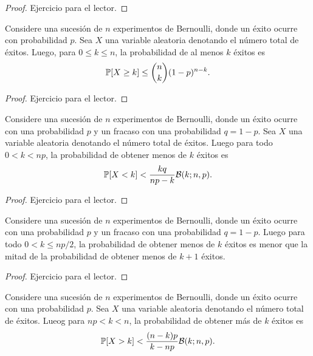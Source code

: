 \begin{proof}
    Ejercicio para el lector.
\end{proof}

\begin{corollary}
    Considere una sucesi\'on de $n$ experimentos de Bernoulli, donde un \'exito ocurre con probabilidad $p$.
    Sea $X$ una variable aleatoria denotando el n\'umero total de \'exitos.
    Luego, para $0 \leq k \leq n$, la probabilidad de al menos $k$ \'exitos es
    \[
        \mathbb{P}[X \geq k] \leq \binom{n}{k} (1 - p)^{n - k}.
    \]
\end{corollary}

\begin{proof}
    Ejercicio para el lector.
\end{proof}

\begin{theorem}
    Considere una sucesi\'on de $n$ experimentos de Bernoulli, donde un \'exito ocurre con una probabilidad $p$
    y un fracaso con una probabilidad $q = 1 - p$.
    Sea $X$ una variable aleatoria denotando el n\'umero total de \'exitos.
    Luego para todo $0 < k < np$, la probabilidad de obtener menos de $k$ \'exitos es
    \[
        \mathbb{P}[X < k] < \frac{kq}{np - k} \mathcal{B}(k; n, p).
    \]
\end{theorem}

\begin{proof}
    Ejercicio para el lector.
\end{proof}

\begin{corollary}
    Considere una sucesi\'on de $n$ experimentos de Bernoulli, donde un \'exito ocurre con una probabilidad $p$
    y un fracaso con una probabilidad $q = 1 - p$.
    Luego para todo $0 < k \leq np / 2$, la probabilidad de obtener menos de $k$ \'exitos es menor que
    la mitad de la probabilidad de obtener menos de $k + 1$ \'exitos.
\end{corollary}

\begin{proof}
    Ejercicio para el lector.
\end{proof}

\begin{corollary}
    Considere una sucesi\'on de $n$ experimentos de Bernoulli, donde un \'exito ocurre con una probabilidad $p$.
    Sea $X$ una variable aleatoria denotando el n\'umero total de \'exitos.
    Lueog para $np < k < n$, la probabilidad de obtener m\'as de $k$ \'exitos es
    \[
        \mathbb{P}[X > k] < \frac{(n - k)p}{k - np} \mathcal{B}(k; n, p).
    \]
\end{corollary}

